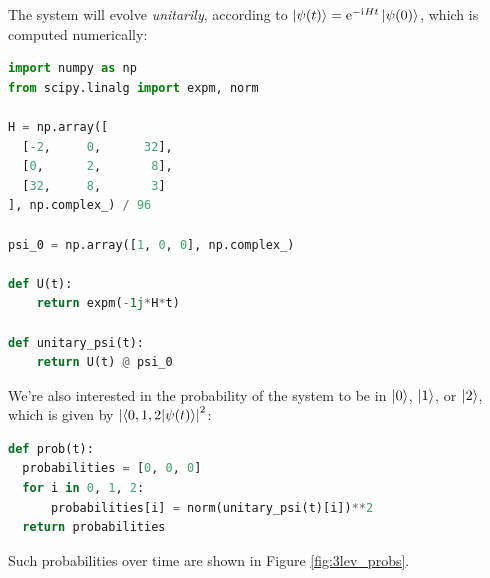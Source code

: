 The system will evolve \emph{unitarily}, according to $\ket{\psi(t)} = \mathrm{e}^{-\mathrm{i}\mkern1mu H t} \ket{\psi(0)}$,
which is computed numerically:
\begin{lstlisting}[language=Python]
import numpy as np
from scipy.linalg import expm, norm

H = np.array([
  [-2,     0,      32],
  [0,      2,       8],
  [32,     8,       3]
], np.complex_) / 96

psi_0 = np.array([1, 0, 0], np.complex_)

def U(t):
    return expm(-1j*H*t)

def unitary_psi(t):
    return U(t) @ psi_0
\end{lstlisting}

We're also interested in the probability of the system to be in $\ket{0}$, $\ket{1}$, or $\ket{2}$,
which is given by $\abs{\braket{0, 1, 2}{\psi(t)}}^2$:
\begin{lstlisting}[language=Python]
def prob(t):
  probabilities = [0, 0, 0]
  for i in 0, 1, 2:
      probabilities[i] = norm(unitary_psi(t)[i])**2
  return probabilities
\end{lstlisting}
Such probabilities over time are shown in Figure \ref{fig:3lev_probs}. 


